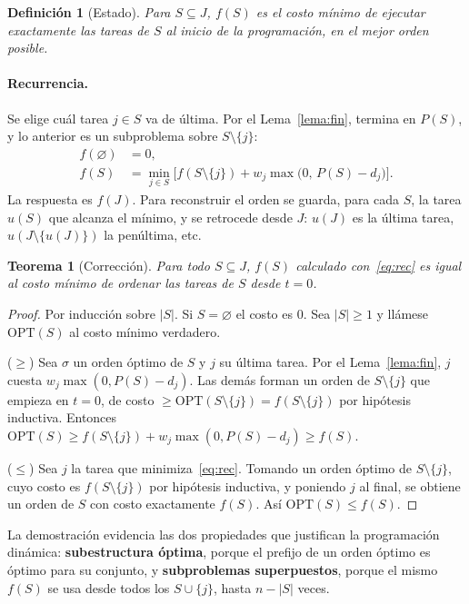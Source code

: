 \documentclass[10pt,twocolumn,letterpaper]{article}
\newtheorem{definicion}{Definición}
\newtheorem{teorema}{Teorema}
\begin{document}
\begin{definicion}[Estado]
Para $S\subseteq J$, $f(S)$ es el costo mínimo de ejecutar \emph{exactamente}
las tareas de $S$ al inicio de la programación, en el mejor orden posible.
\end{definicion}

\paragraph{Recurrencia.} Se elige cuál tarea $j\in S$ va de última. Por el
Lema~\ref{lema:fin}, termina en $P(S)$, y lo anterior es un subproblema sobre
$S\setminus\{j\}$:
\begin{equation}\label{eq:rec}
\boxed{
\begin{aligned}
f(\varnothing)&=0,\\
f(S)&=\min_{j\in S}\Big[f(S\setminus\{j\})+w_j\max\big(0,\,P(S)-d_j\big)\Big].
\end{aligned}}
\end{equation}
La respuesta es $f(J)$. Para reconstruir el orden se guarda, para cada $S$, la
tarea $u(S)$ que alcanza el mínimo, y se retrocede desde $J$:
$u(J)$ es la última tarea, $u(J\setminus\{u(J)\})$ la penúltima, etc.

\begin{teorema}[Corrección]
Para todo $S\subseteq J$, $f(S)$ calculado con~\eqref{eq:rec} es igual al costo
mínimo de ordenar las tareas de $S$ desde $t=0$.
\end{teorema}

\begin{proof}
Por inducción sobre $|S|$. Si $S=\varnothing$ el costo es $0$. Sea
$|S|\ge1$ y llámese $\mathrm{OPT}(S)$ al costo mínimo verdadero.

($\ge$) Sea $\sigma$ un orden óptimo de $S$ y $j$ su última tarea. Por el
Lema~\ref{lema:fin}, $j$ cuesta $w_j\max(0,P(S)-d_j)$. Las demás forman un orden
de $S\setminus\{j\}$ que empieza en $t=0$, de costo
$\ge\mathrm{OPT}(S\setminus\{j\})=f(S\setminus\{j\})$ por hipótesis
inductiva. Entonces $\mathrm{OPT}(S)\ge f(S\setminus\{j\})+w_j\max(0,P(S)-d_j)\ge f(S)$.

($\le$) Sea $j$ la tarea que minimiza~\eqref{eq:rec}. Tomando un orden óptimo
de $S\setminus\{j\}$, cuyo costo es $f(S\setminus\{j\})$ por hipótesis
inductiva, y poniendo $j$ al final, se obtiene un orden de $S$ con costo
exactamente $f(S)$. Así $\mathrm{OPT}(S)\le f(S)$.
\end{proof}

La demostración evidencia las dos propiedades que justifican la programación
dinámica: \textbf{subestructura óptima}, porque el prefijo de un orden óptimo
es óptimo para su conjunto, y \textbf{subproblemas superpuestos}, porque el
mismo $f(S)$ se usa desde todos los $S\cup\{j\}$, hasta $n-|S|$ veces.
\end{document}
